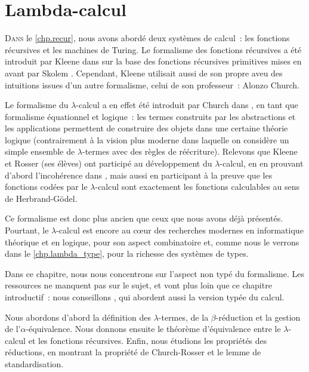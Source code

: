 \chapter{Lambda-calcul}
\label{chp.lambda}

\minitoc

\lettrine{D}{ans} le \cref{chp.recur}, nous avons abordé deux systèmes de
calcul~: les fonctions récursives et les machines de Turing. Le formalisme des
fonctions récursives a été introduit par Kleene dans \cite{Kleene1936} sur la
base des fonctions récursives primitives mises en avant par Skolem
\cite{Skolem1923}. Cependant, Kleene utilisait aussi de son propre
aveu des intuitions issues d'un autre formalisme, celui de son professeur~:
Alonzo Church.

Le formalisme du $\lambda$-calcul a en effet été introduit par Church dans
\cite{Church1932,Church1933}, en tant que formalisme équationnel et logique~:
les termes
construits par les abstractions et les applications permettent de construire des
objets dans une certaine théorie logique (contrairement à la vision plus
moderne dans laquelle on considère un simple ensemble de $\lambda$-termes avec
des règles de réécriture). Relevons que Kleene et Rosser (ses élèves) ont
participé au développement du $\lambda$-calcul, en en prouvant d'abord
l'incohérence dans \cite{KleeneRosser1935}, mais aussi en participant à la
preuve que les fonctions codées par le $\lambda$-calcul sont exactement les
fonctions calculables au sens de Herbrand-Gödel.

Ce formalisme est donc plus ancien que ceux que nous avons déjà présentés.
Pourtant, le $\lambda$-calcul est encore au c\oe ur des recherches modernes en
informatique théorique et en logique, pour son aspect combinatoire et,
comme nous le verrons dans le \cref{chp.lambda_type}, pour la richesse des
systèmes de types.

Dans ce chapitre, nous nous concentrons sur l'aspect non typé du formalisme.
Les ressources ne manquent pas sur le sujet, et vont plus loin que ce chapitre
introductif~: nous conseillons \cite{Barendregt1984,Krivine1990,Selinger2018},
qui abordent aussi la version typée du calcul.

Nous abordons d'abord la définition des $\lambda$-termes, de la
$\beta$-réduction et la gestion de l'$\alpha$-équivalence. Nous donnons ensuite
le théorème d'équivalence entre le $\lambda$-calcul et les fonctions récursives.
Enfin, nous étudions les propriétés des réductions, en montrant la
propriété de Church-Rosser et le lemme de standardisation.

